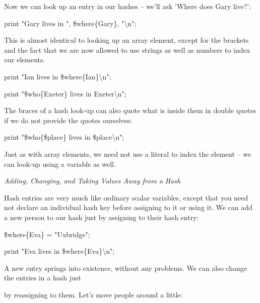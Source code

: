 \documentclass[a4paper,11pt]{book}
\begin{document}
\noindent 

\noindent Now we can look up an entry in our hashes -- we'll ask 'Where does Gary live?':

\noindent 

\noindent print "Gary lives in ", \$where\{Gary\}, "\textbackslash n";

\noindent 

\noindent This is almost identical to looking up an array element, except for the brackets and the fact that we are now allowed to use strings as well as numbers to index our elements.

\noindent 

\noindent print "Ian lives in \$where\{Ian\}\textbackslash n";

\noindent print "\$who\{Exeter\} lives in Exeter\textbackslash n";

\noindent 

\noindent The braces of a hash look-up can also quote what is inside them in double quotes if we do not provide the quotes ourselves:

\noindent 

\noindent print "\$who\{\$place\} lives in \$place\textbackslash n";

\noindent 

\noindent Just as with array elements, we need not use a literal to index the element -- we can look-up using a variable as well.

\noindent 

\noindent \textit{Adding, Changing, and Taking Values Away from a Hash}

\noindent Hash entries are very much like ordinary scalar variables, except that you need not declare an individual hash key before assigning to it or using it. We can add a new person to our hash just by assigning to their hash entry:

\noindent 

\noindent \$where\{Eva\} = "Uxbridge";

\noindent print "Eva lives in \$where\{Eva\}\textbackslash n";

\noindent 

\noindent 

\noindent A new entry springs into existence, without any problems. We can also change the entries in a hash just

\noindent by reassigning to them. Let's move people around a little:

\noindent 
\end{document}
